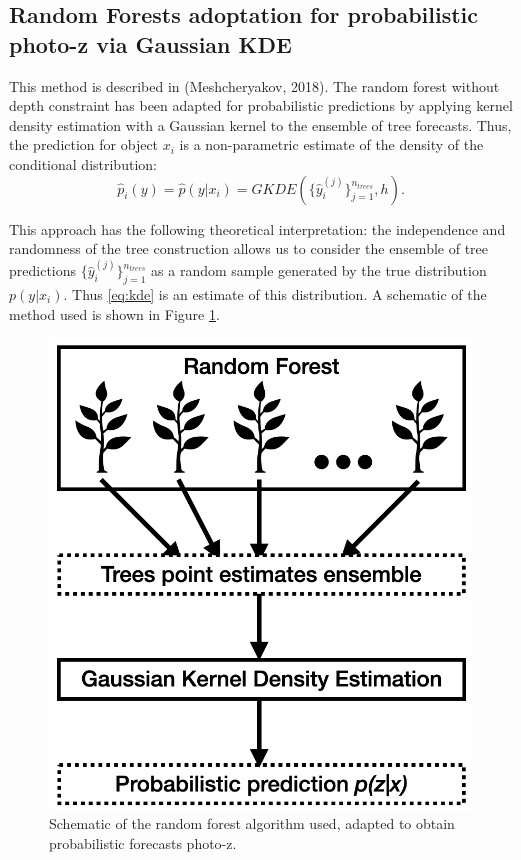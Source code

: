 \documentclass[fleqn,usenatbib]{mnras}
\begin{document}
\subsection{Random Forests adoptation for probabilistic photo-z via Gaussian KDE}
This method is described in (Meshcheryakov, 2018). The random forest without depth constraint has been adapted for probabilistic predictions by applying kernel density estimation with a Gaussian kernel to the ensemble of tree forecasts. Thus, the prediction for object $x_i$ is a non-parametric estimate of the density of the conditional distribution:
\begin{equation}\label{eq:predproba}
    \hat{p}_i (y) = \hat{p}(y|x_i) = GKDE(\{\hat{y}^{(j)}_i\}_{j=1}^{n_{trees}}, h).
\end{equation}

This approach has the following theoretical interpretation: the independence and randomness of the tree construction allows us to consider the ensemble of tree predictions $\{\hat{y}^{(j)}_i\}_{j=1}^{n_{trees}}$ as a random sample generated by the true distribution $p(y|x_i)$. Thus \eqref{eq:kde} is an estimate of this distribution. A schematic of the method used is shown in Figure \ref{fig:qrf_scheme}.

\begin{figure}
    \centering
    \includegraphics[width=0.95\linewidth]{images/qrf.png}
    \caption{Schematic of the random forest algorithm used, adapted to obtain probabilistic forecasts photo-z.}
    \label{fig:qrf_scheme}
\end{figure}
\end{document}
